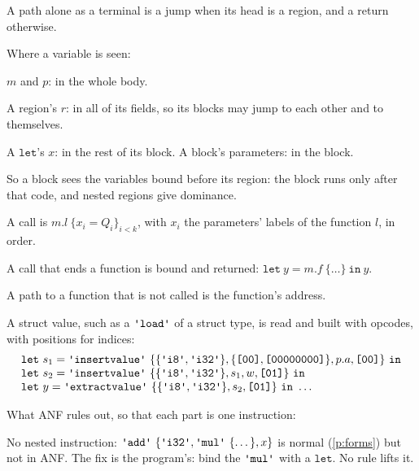 \documentclass[11pt,letterpaper]{article}
\newcommand{\kw}[1]{\mathtt{#1}}
\newcommand{\str}[1]{\text{\ttfamily\textquotesingle #1\textquotesingle}}  %
\newcommand{\hex}[1]{\text{\ttfamily [#1]}}  %
\newcommand{\pref}[1]{\ref{#1}}  %
\begin{document}
\begin{points}
\begin{subpoints}
  \item A path alone as a terminal is a jump when its head is a region, and a return otherwise.
  \end{subpoints}
\item\label{p:groups} Where a variable is seen:
  \begin{subpoints}
  \item $m$ and $p$: in the whole body.
  \item A region's $r$: in all of its fields, so its blocks may jump to each other and to themselves.
  \item A $\kw{let}$'s $x$: in the rest of its block. A block's parameters: in the block.
  \item So a block sees the variables bound before its region: the block runs only after that code, and
    nested regions give dominance.
  \end{subpoints}
\item\label{p:calls} A call is $m.l\ \{x_i = Q_i\}_{i<k}$, with $x_i$ the parameters' labels of the function $l$, in order.
  \begin{subpoints}
  \item A call that ends a function is bound and returned: $\kw{let}\ y = m.f\ \{\dots\}\ \kw{in}\ y$.
  \item A path to a function that is not called is the function's address.
  \end{subpoints}
\item\label{p:struct-values} A struct value, such as a $\str{load}$ of a struct type, is read and built
  with opcodes, with positions for indices:
  \[\begin{array}{l}\kw{let}\ s_1 = \str{insertvalue}\ \{\{\str{i8}, \str{i32}\}, \{\hex{00}, \hex{00000000}\}, p.a, \hex{00}\}\ \kw{in} \\
    \kw{let}\ s_2 = \str{insertvalue}\ \{\{\str{i8}, \str{i32}\}, s_1, w, \hex{01}\}\ \kw{in} \\
    \kw{let}\ y = \str{extractvalue}\ \{\{\str{i8}, \str{i32}\}, s_2, \hex{01}\}\ \kw{in}\ \dots\end{array}\]
\item\label{p:anf-rules} What ANF rules out, so that each part is one instruction:
  \begin{subpoints}
  \item No nested instruction: $\str{add}\ \{\str{i32}, \str{mul}\ \{\dots\}, x\}$ is normal (\pref{p:forms}) but not in
    ANF. The fix is the program's: bind the $\str{mul}$ with a $\kw{let}$. No rule lifts it.

\end{subpoints}
\end{points}
\end{document}

